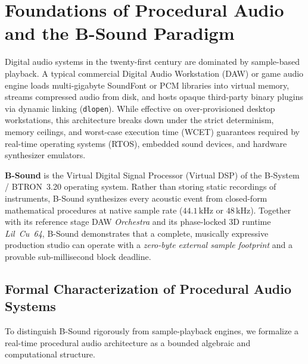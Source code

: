 \chapter{Foundations of Procedural Audio and the B-Sound Paradigm}
\label{ch:intro}

Digital audio systems in the twenty-first century are dominated by sample-based playback. A typical commercial Digital Audio Workstation (DAW) or game audio engine loads multi-gigabyte SoundFont or PCM libraries into virtual memory, streams compressed audio from disk, and hosts opaque third-party binary plugins via dynamic linking (\texttt{dlopen}). While effective on over-provisioned desktop workstations, this architecture breaks down under the strict determinism, memory ceilings, and worst-case execution time (WCET) guarantees required by real-time operating systems (RTOS), embedded sound devices, and hardware synthesizer emulators.

\textbf{B-Sound} is the Virtual Digital Signal Processor (Virtual DSP) of the B-System / BTRON~3.20 operating system. Rather than storing static recordings of instruments, B-Sound synthesizes every acoustic event from closed-form mathematical procedures at native sample rate ($44.1\,\text{kHz}$ or $48\,\text{kHz}$). Together with its reference stage DAW \emph{Orchestra} and its phase-locked 3D runtime \emph{Lil~Cu~64}, B-Sound demonstrates that a complete, musically expressive production studio can operate with a \emph{zero-byte external sample footprint} and a provable sub-millisecond block deadline.

\section{Formal Characterization of Procedural Audio Systems}

To distinguish B-Sound rigorously from sample-playback engines, we formalize a real-time procedural audio architecture as a bounded algebraic and computational structure.

